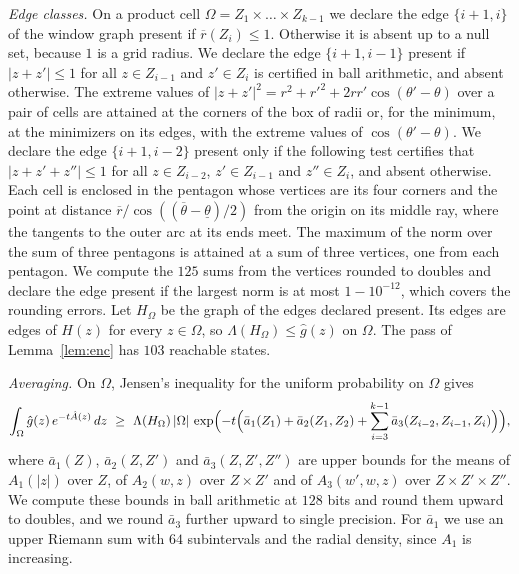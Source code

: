 \documentclass[11pt]{amsart}
\theoremstyle{definition}
\theoremstyle{remark}
\numberwithin{equation}{section}
\begin{document}
\emph{Edge classes.} On a product cell $\Omega=Z_1\times\dots\times Z_{k-1}$ we declare the edge $\{i+1,i\}$ of the window graph present if $\overline r(Z_i)\le1$. Otherwise it is absent up to a null set, because $1$ is a grid radius. We declare the edge $\{i+1,i-1\}$ present if $|z+z'|\le1$ for all $z\in Z_{i-1}$ and $z'\in Z_i$ is certified in ball arithmetic, and absent otherwise. The extreme values of $|z+z'|^2=r^2+r'^2+2rr'\cos(\theta'-\theta)$ over a pair of cells are attained at the corners of the box of radii or, for the minimum, at the minimizers on its edges, with the extreme values of $\cos(\theta'-\theta)$. We declare the edge $\{i+1,i-2\}$ present only if the following test certifies that $|z+z'+z''|\le1$ for all $z\in Z_{i-2}$, $z'\in Z_{i-1}$ and $z''\in Z_i$, and absent otherwise. Each cell is enclosed in the pentagon whose vertices are its four corners and the point at distance $\overline r/\cos((\overline\theta-\underline\theta)/2)$ from the origin on its middle ray, where the tangents to the outer arc at its ends meet. The maximum of the norm over the sum of three pentagons is attained at a sum of three vertices, one from each pentagon. We compute the $125$ sums from the vertices rounded to doubles and declare the edge present if the largest norm is at most $1-10^{-12}$, which covers the rounding errors. Let $H_\Omega$ be the graph of the edges declared present. Its edges are edges of $H(z)$ for every $z\in\Omega$, so $\Lambda(H_\Omega)\le\hat g(z)$ on $\Omega$. The pass of Lemma~\ref{lem:enc} has $103$ reachable states.

\emph{Averaging.} On $\Omega$, Jensen's inequality for the uniform probability on $\Omega$ gives
\[
\int_\Omega\hat g(z)\,e^{-t\hat A(z)}\,dz\ \ge\ \Lambda(H_\Omega)\,|\Omega|\,\exp\Bigl(-t\Bigl(\bar a_1(Z_1)+\bar a_2(Z_1,Z_2)+\sum_{i=3}^{k-1}\bar a_3(Z_{i-2},Z_{i-1},Z_i)\Bigr)\Bigr),
\]
where $\bar a_1(Z)$, $\bar a_2(Z,Z')$ and $\bar a_3(Z,Z',Z'')$ are upper bounds for the means of $A_1(|z|)$ over $Z$, of $A_2(w,z)$ over $Z\times Z'$ and of $A_3(w',w,z)$ over $Z\times Z'\times Z''$. We compute these bounds in ball arithmetic at $128$ bits and round them upward to doubles, and we round $\bar a_3$ further upward to single precision. For $\bar a_1$ we use an upper Riemann sum with $64$ subintervals and the radial density, since $A_1$ is increasing.
\end{document}
